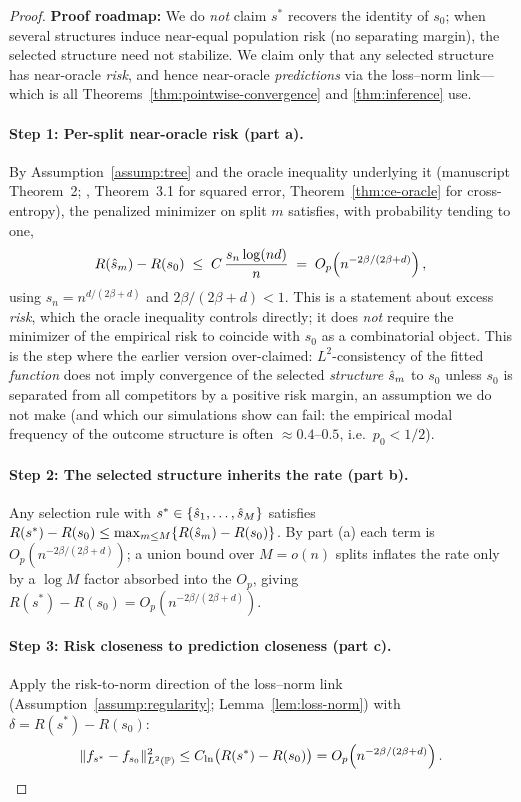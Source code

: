 \documentclass[12pt]{article}
\begin{document}
\begin{proof}
\textbf{Proof roadmap:} We do \emph{not} claim $s^*$ recovers the identity of $s_0$; when several structures induce near-equal population risk (no separating margin), the selected structure need not stabilize. We claim only that any selected structure has near-oracle \emph{risk}, and hence near-oracle \emph{predictions} via the loss--norm link---which is all Theorems~\ref{thm:pointwise-convergence} and \ref{thm:inference} use.

\paragraph{Step 1: Per-split near-oracle risk (part a).}
By Assumption~\ref{assump:tree} and the oracle inequality underlying it (manuscript Theorem~2; \citealp{xuStatisticalOptimalityOptimal2026}, Theorem~3.1 for squared error, Theorem~\ref{thm:ce-oracle} for cross-entropy), the penalized minimizer on split $m$ satisfies, with probability tending to one,
\[
R(\hat{s}_m) - R(s_0) \;\le\; C\,\frac{s_n \log(n d)}{n} \;=\; O_p\!\left(n^{-2\beta/(2\beta+d)}\right),
\]
using $s_n = n^{d/(2\beta+d)}$ and $2\beta/(2\beta+d) < 1$. This is a statement about excess \emph{risk}, which the oracle inequality controls directly; it does \emph{not} require the minimizer of the empirical risk to coincide with $s_0$ as a combinatorial object. This is the step where the earlier version over-claimed: $L^2$-consistency of the fitted \emph{function} does not imply convergence of the selected \emph{structure} $\hat{s}_m$ to $s_0$ unless $s_0$ is separated from all competitors by a positive risk margin, an assumption we do not make (and which our simulations show can fail: the empirical modal frequency of the outcome structure is often $\approx 0.4$--$0.5$, i.e.\ $p_0 < 1/2$).

\paragraph{Step 2: The selected structure inherits the rate (part b).}
Any selection rule with $s^* \in \{\hat{s}_1,\dots,\hat{s}_M\}$ satisfies $R(s^*) - R(s_0) \le \max_{m\le M}\{R(\hat{s}_m) - R(s_0)\}$. By part (a) each term is $O_p(n^{-2\beta/(2\beta+d)})$; a union bound over $M = o(n)$ splits inflates the rate only by a $\log M$ factor absorbed into the $O_p$, giving $R(s^*) - R(s_0) = O_p(n^{-2\beta/(2\beta+d)})$.

\paragraph{Step 3: Risk closeness to prediction closeness (part c).}
Apply the risk-to-norm direction of the loss--norm link (Assumption~\ref{assump:regularity}; Lemma~\ref{lem:loss-norm}) with $\delta = R(s^*) - R(s_0)$:
\[
\|f_{s^*} - f_{s_0}\|_{L^2(\mathbb{P})}^2 \le C_{\mathrm{ln}}\bigl(R(s^*)-R(s_0)\bigr) = O_p\!\left(n^{-2\beta/(2\beta+d)}\right). \qedhere
\]
\end{proof}
\end{document}
